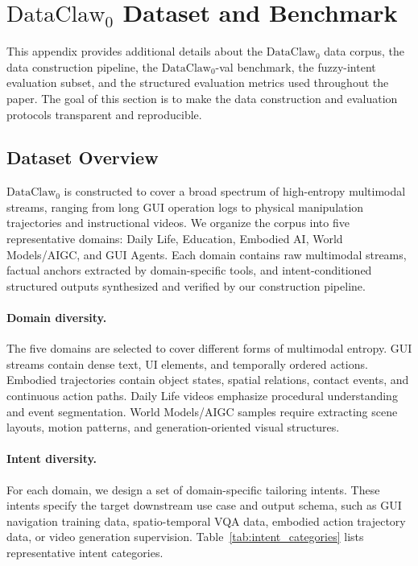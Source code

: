 \documentclass{llmxive}
\begin{document}
\section{\texorpdfstring{$\text{DataClaw}_0$}{DataClaw0} Dataset and Benchmark}
\label{app:dataset_benchmark}

This appendix provides additional details about the $\text{DataClaw}_0$ data corpus, the data construction pipeline, the $\text{DataClaw}_0$-val benchmark, the fuzzy-intent evaluation subset, and the structured evaluation metrics used throughout the paper. The goal of this section is to make the data construction and evaluation protocols transparent and reproducible.

\subsection{Dataset Overview}
\label{app:dataset_overview}

$\text{DataClaw}_0$ is constructed to cover a broad spectrum of high-entropy multimodal streams, ranging from long GUI operation logs to physical manipulation trajectories and instructional videos. We organize the corpus into five representative domains: Daily Life, Education, Embodied AI, World Models/AIGC, and GUI Agents. Each domain contains raw multimodal streams, factual anchors extracted by domain-specific tools, and intent-conditioned structured outputs synthesized and verified by our construction pipeline.


\paragraph{Domain diversity.}
The five domains are selected to cover different forms of multimodal entropy. GUI streams contain dense text, UI elements, and temporally ordered actions. Embodied trajectories contain object states, spatial relations, contact events, and continuous action paths. Daily Life videos emphasize procedural understanding and event segmentation. World Models/AIGC samples require extracting scene layouts, motion patterns, and generation-oriented visual structures.

\paragraph{Intent diversity.}
For each domain, we design a set of domain-specific tailoring intents. These intents specify the target downstream use case and output schema, such as GUI navigation training data, spatio-temporal VQA data, embodied action trajectory data, or video generation supervision. Table~\ref{tab:intent_categories} lists representative intent categories.
\end{document}
